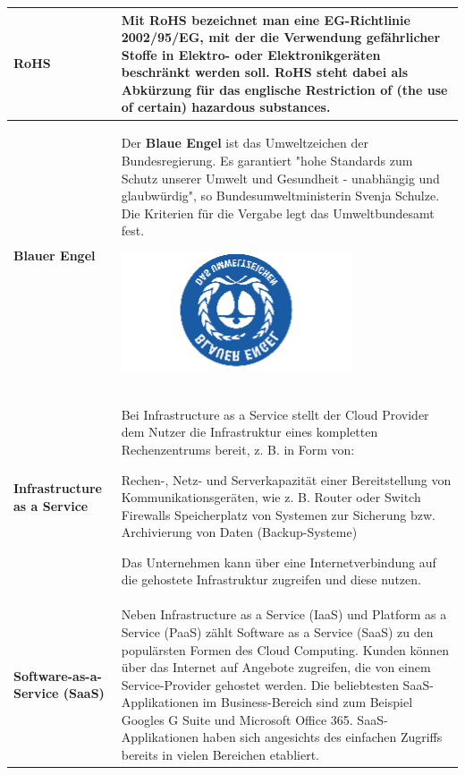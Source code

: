 \documentclass[10pt]{article}
\begin{document}
\begin{flushleft}
\begin{longtable}{|p{}|p{}|}
        \textbf{RoHS}&
        Mit \textbf{RoHS} bezeichnet man eine EG-Richtlinie 2002/95/EG, mit der die Verwendung gefährlicher Stoffe in Elektro- oder Elektronikgeräten beschränkt werden soll. \textbf{RoHS} steht dabei als Abkürzung für das englische Restriction of (the use of certain) hazardous substances.
        \\\hline

        \textbf{Blauer Engel}&
        Der \textbf{Blaue Engel} ist das Umweltzeichen der Bundesregierung. Es garantiert "hohe Standards zum Schutz unserer Umwelt und Gesundheit - unabhängig und glaubwürdig", so Bundesumweltministerin Svenja Schulze. Die Kriterien für die Vergabe legt das Umweltbundesamt fest.
        
        \includegraphics{blauer-engel.png}
        \\\hline

        \textbf{Infrastructure as a Service}&
        Bei Infrastructure as a Service stellt der Cloud Provider dem Nutzer die Infrastruktur eines kompletten Rechenzentrums bereit, z. B. in Form von: 
        \begin{outline}
            \1 Rechen-, Netz- und Serverkapazität 
            \1 einer Bereitstellung von Kommunikationsgeräten, wie z. B. Router oder Switch 
            \1 Firewalls 
            \1 Speicherplatz 
            \1 von Systemen zur Sicherung bzw. Archivierung von Daten (Backup-Systeme) 
        \end{outline}
        Das Unternehmen kann über eine Internetverbindung auf die gehostete Infrastruktur zugreifen und diese nutzen.
        \\\hline

        \textbf{Software-as-a-Service (SaaS)}&
        Neben Infrastructure as a Service (IaaS) und Platform as a Service (PaaS) zählt Software as a Service (SaaS) zu den populärsten Formen des Cloud Computing. Kunden können über das Internet auf Angebote zugreifen, die von einem Service-Provider gehostet werden. Die beliebtesten SaaS-Applikationen im Business-Bereich sind zum Beispiel Googles G Suite und Microsoft Office 365. SaaS-Applikationen haben sich angesichts des einfachen Zugriffs bereits in vielen Bereichen etabliert.
        

\end{longtable}
\end{flushleft}
\end{document}
